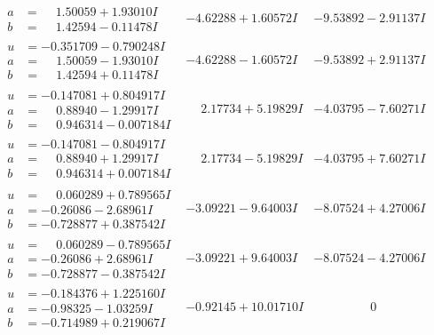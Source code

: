 \documentclass[1p]{elsarticle_modified}
\theoremstyle{definition}
\begin{document}
$$\begin{array}{c|c|c}
\begin{aligned}
a &= \phantom{-}1.50059 + 1.93010 I \\
b &= \phantom{-}1.42594 - 0.11478 I\end{aligned}
 & -4.62288 + 1.60572 I & -9.53892 - 2.91137 I \\ \hline\begin{aligned}
u &= -0.351709 - 0.790248 I \\
a &= \phantom{-}1.50059 - 1.93010 I \\
b &= \phantom{-}1.42594 + 0.11478 I\end{aligned}
 & -4.62288 - 1.60572 I & -9.53892 + 2.91137 I \\ \hline\begin{aligned}
u &= -0.147081 + 0.804917 I \\
a &= \phantom{-}0.88940 - 1.29917 I \\
b &= \phantom{-}0.946314 - 0.007184 I\end{aligned}
 & \phantom{-}2.17734 + 5.19829 I & -4.03795 - 7.60271 I \\ \hline\begin{aligned}
u &= -0.147081 - 0.804917 I \\
a &= \phantom{-}0.88940 + 1.29917 I \\
b &= \phantom{-}0.946314 + 0.007184 I\end{aligned}
 & \phantom{-}2.17734 - 5.19829 I & -4.03795 + 7.60271 I \\ \hline\begin{aligned}
u &= \phantom{-}0.060289 + 0.789565 I \\
a &= -0.26086 - 2.68961 I \\
b &= -0.728877 + 0.387542 I\end{aligned}
 & -3.09221 - 9.64003 I & -8.07524 + 4.27006 I \\ \hline\begin{aligned}
u &= \phantom{-}0.060289 - 0.789565 I \\
a &= -0.26086 + 2.68961 I \\
b &= -0.728877 - 0.387542 I\end{aligned}
 & -3.09221 + 9.64003 I & -8.07524 - 4.27006 I \\ \hline\begin{aligned}
u &= -0.184376 + 1.225160 I \\
a &= -0.98325 - 1.03259 I \\
b &= -0.714989 + 0.219067 I\end{aligned}
 & -0.92145 + 10.01710 I & \phantom{-0.000000 } 0 \\ \hline\begin{aligned}

\end{aligned}
\end{array}$$
\end{document}
